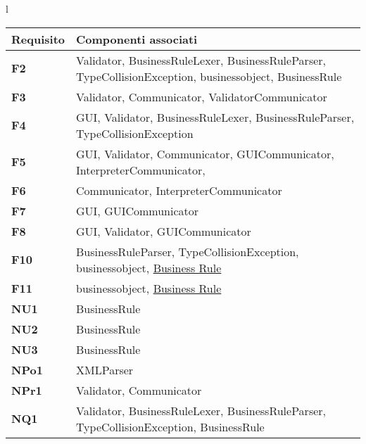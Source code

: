 \begin{center}


\large{
\begin{tabular}{l}
\begin{tabular}{||p{3cm}||p{9cm}||} \hline
\textbf{Requisito} & {Componenti associati} \\ \hline
\textbf{F2} & Validator, BusinessRuleLexer, BusinessRuleParser, TypeCollisionException, businessobject, BusinessRule \\ \hline
\textbf{F3} & Validator, Communicator, ValidatorCommunicator \\ \hline
\textbf{F4} & GUI, Validator, BusinessRuleLexer, BusinessRuleParser, TypeCollisionException \\ \hline
\textbf{F5} & GUI, Validator, Communicator, GUICommunicator, InterpreterCommunicator, \\ \hline
\textbf{F6} & Communicator, InterpreterCommunicator \\ \hline
\textbf{F7} & GUI, GUICommunicator \\ \hline
\textbf{F8} & GUI, Validator, GUICommunicator \\ \hline
\textbf{F10} & BusinessRuleParser, TypeCollisionException, businessobject, \underline{Business Rule} \\ \hline
\textbf{F11} & businessobject, \underline{Business Rule} \\ \hline
\textbf{NU1} & BusinessRule \\ \hline
\textbf{NU2} & BusinessRule \\ \hline
\textbf{NU3} & BusinessRule \\ \hline
\textbf{NPo1} &  XMLParser \\ \hline
\textbf{NPr1} & Validator, Communicator \\ \hline
\textbf{NQ1} & Validator, BusinessRuleLexer, BusinessRuleParser, TypeCollisionException, BusinessRule \\ \hline
\end{tabular} \\
\end{tabular}
}
\end{center}


